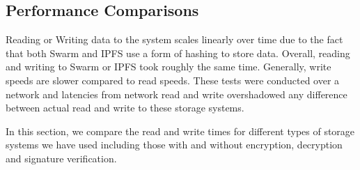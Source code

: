 \documentclass[11pt,openright]{report}
\begin{document}
\subsection{Performance Comparisons}
Reading or Writing data to the system scales linearly over time due to the fact that both Swarm and IPFS use a form of hashing to store data. Overall, reading and writing to Swarm or IPFS took roughly the same time. Generally, write speeds are slower compared to read speeds. These tests were conducted over a network and latencies from network read and write overshadowed any difference between actual read and write to these storage systems.

In this section, we compare the read and write times for different types of storage systems we have used including those with and without encryption, decryption and signature verification.
\end{document}
